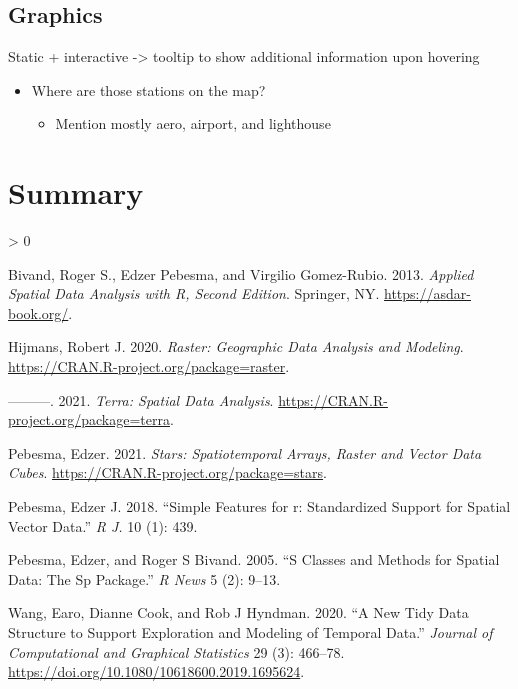 \documentclass{article}
\newlength{\cslhangindent}
\newenvironment{CSLReferences}[2] %
 {%
  \setlength{\parindent}{0pt}
  \ifodd #1 \everypar{\setlength{\hangindent}{\cslhangindent}}\ignorespaces\fi
  \ifnum #2 > 0
  \setlength{\parskip}{#2\baselineskip}
  \fi
 }%
 {}
\begin{document}
\hypertarget{graphics}{%
\subsection{Graphics}\label{graphics}}

Static + interactive -\textgreater{} tooltip to show additional
information upon hovering

\begin{itemize}
\tightlist
\item
  Where are those stations on the map?

  \begin{itemize}
  \tightlist
  \item
    Mention mostly aero, airport, and lighthouse
  \end{itemize}
\end{itemize}

\hypertarget{summary}{%
\section*{Summary}\label{summary}}

\hypertarget{refs}{}
\begin{CSLReferences}{1}{0}
\leavevmode\hypertarget{ref-spacetimebook}{}%
Bivand, Roger S., Edzer Pebesma, and Virgilio Gomez-Rubio. 2013.
\emph{Applied Spatial Data Analysis with {R}, Second Edition}. Springer,
NY. \url{https://asdar-book.org/}.

\leavevmode\hypertarget{ref-raster}{}%
Hijmans, Robert J. 2020. \emph{Raster: Geographic Data Analysis and
Modeling}. \url{https://CRAN.R-project.org/package=raster}.

\leavevmode\hypertarget{ref-terra}{}%
---------. 2021. \emph{Terra: Spatial Data Analysis}.
\url{https://CRAN.R-project.org/package=terra}.

\leavevmode\hypertarget{ref-stars}{}%
Pebesma, Edzer. 2021. \emph{Stars: Spatiotemporal Arrays, Raster and
Vector Data Cubes}. \url{https://CRAN.R-project.org/package=stars}.

\leavevmode\hypertarget{ref-pebesma2018simple}{}%
Pebesma, Edzer J. 2018. {``Simple Features for r: Standardized Support
for Spatial Vector Data.''} \emph{R J.} 10 (1): 439.

\leavevmode\hypertarget{ref-pebesma2005s}{}%
Pebesma, Edzer, and Roger S Bivand. 2005. {``S Classes and Methods for
Spatial Data: The Sp Package.''} \emph{R News} 5 (2): 9--13.

\leavevmode\hypertarget{ref-tsibbles}{}%
Wang, Earo, Dianne Cook, and Rob J Hyndman. 2020. {``A New Tidy Data
Structure to Support Exploration and Modeling of Temporal Data.''}
\emph{Journal of Computational and Graphical Statistics} 29 (3):
466--78. \url{https://doi.org/10.1080/10618600.2019.1695624}.

\end{CSLReferences}



\end{document}
